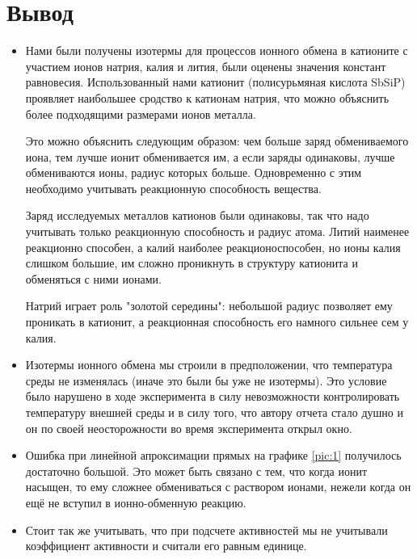 \documentclass[a4paper,12pt]{article} %
\begin{document}
\section{Вывод}
\begin{itemize}
    \item Нами были получены изотермы для процессов ионного обмена в катионите с участием
ионов натрия, калия и лития, были оценены значения констант равновесия. Использованный нами катионит (полисурьмяная кислота SbSiP) проявляет наибольшее сродство к катионам натрия, что можно объяснить более подходящими размерами ионов металла.

Это можно объяснить следующим образом: чем больше заряд обмениваемого иона, тем лучше ионит обменивается им, а если заряды одинаковы, лучше обмениваются ионы, радиус которых больше. Одновременно с этим необходимо учитывать реакционную способность вещества. 

Заряд исследуемых металлов катионов были одинаковы, так что надо учитывать только реакционную способность и радиус атома. Литий наименее реакционно способен, а калий наиболее реакционоспособен, но ионы калия слишком большие, им сложно проникнуть в структуру катионита и обменяться с ними ионами.

Натрий играет роль "золотой середины": небольшой радиус позволяет ему проникать в катионит, а реакционная способность его намного сильнее сем у калия.

\item Изотермы ионного обмена мы строили в предположении, что температура среды не изменялась (иначе это были бы уже не изотермы). Это условие было нарушено в ходе эксперимента в силу невозможности контролировать температуру внешней среды и в силу того, что автору отчета стало душно и он по своей неосторожности во время эксперимента открыл окно.

\item Ошибка при линейной апроксимации прямых на графике \ref{pic:1} получилось достаточно большой. Это может быть связано с тем, что когда ионит насыщен, то ему сложнее обмениваться с раствором ионами, нежели когда он ещё не вступил в ионно-обменную реакцию.

\item Стоит так же учитывать, что при подсчете активностей мы не учитывали коэффициент активности и считали его равным единице.

\end{itemize}
\end{document}
